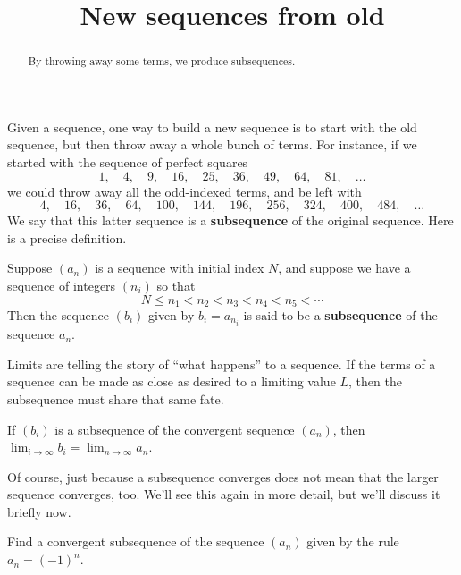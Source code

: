 \documentclass{ximera}
\title{New sequences from old}
\newcommand{\defnword}[1]{\textbf{#1}}
\newcommand{\ds}{\displaystyle}
\newcommand{\index}[1]{}
\begin{document}
\begin{abstract}
  By throwing away some terms, we produce subsequences.
\end{abstract}

\maketitle

\label{section:new-sequences-from-old}

Given a sequence, one way to build a new sequence is to start with the
old sequence, but then throw away a whole bunch of terms.  For
instance, if we started with the sequence of perfect squares
$$
1,\quad 4,\quad 9,\quad 16,\quad 25,\quad 36,\quad 49,\quad 64,\quad 81,\quad\ldots
$$
we could throw away all the odd-indexed terms, and be left with
$$
4,\quad 16,\quad 36,\quad 64,\quad 100,\quad 144,\quad 196,\quad 256,\quad 324,\quad 400,\quad 484,\quad\ldots
$$
We say that this latter sequence is a
\defnword{subsequence}\index{sequence!subsequence}\index{subsequence}
of the original sequence.  Here is a precise definition.

\begin{definition}
  Suppose $(a_n)$ is a sequence with initial index $N$, and suppose we have a sequence of integers $(n_i)$ so that
  $$
  N \leq n_1 < n_2 < n_3 < n_4 < n_5 < \cdots 
  $$
  Then the sequence $(b_i)$ given by $b_i = a_{n_i}$ is said to be a \defnword{subsequence}\index{sequence!subsequence}\index{subsequence}
  of the sequence $a_n$.
\end{definition}


Limits are telling the story of ``what happens'' to a sequence.  If
the terms of a sequence can be made as close as desired to a limiting
value $L$, then the subsequence must share that same fate.

\begin{theorem}
  \label{theorem:subsequence-same-limit}
  If $(b_i)$ is a subsequence of the convergent sequence $(a_n)$, then
  $\ds\lim_{i \to \infty} b_i = \ds\lim_{n \to \infty} a_n$.
\end{theorem}

Of course, just because a subsequence converges does not mean that the
larger sequence converges, too.  We'll see this again in more detail,
but we'll discuss it briefly now.

\begin{example}
Find a convergent subsequence of the sequence $(a_n)$ given by the rule $a_n = (-1)^n$.
\end{example}
\end{document}
